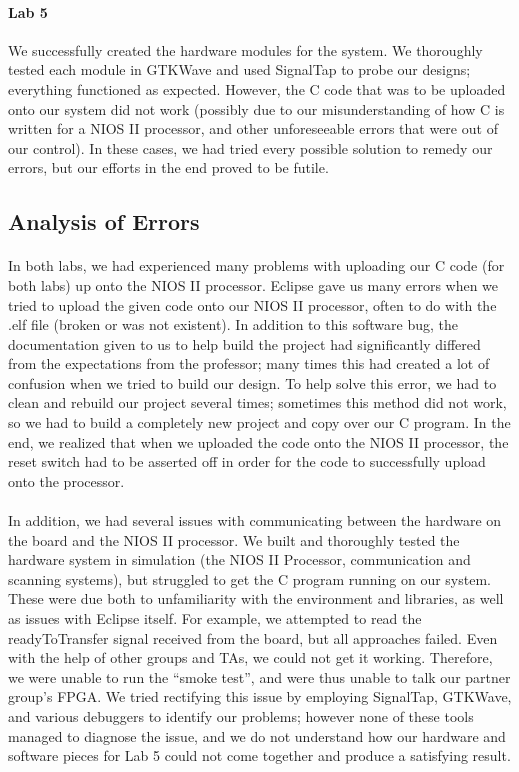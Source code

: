 \documentclass{article}
\begin{document}
  \paragraph{Lab 5} We successfully created the hardware modules for the system. We thoroughly tested each module in GTKWave and used SignalTap to probe our designs; everything functioned as expected. However, the C code that was to be uploaded onto our system did not work (possibly due to our misunderstanding of how C is written for a NIOS II processor, and other unforeseeable errors that were out of our control). In these cases, we had tried every possible solution to remedy our errors, but our efforts in the end proved to be futile.
  
  \subsection{Analysis of Errors}
  \paragraph{} In both labs, we had experienced many problems with uploading our C code (for both labs) up onto the NIOS II processor. Eclipse gave us many errors when we tried to upload the given code onto our NIOS II processor, often to do with the .elf file (broken or was not existent). In addition to this software bug, the documentation given to us to help build the project had significantly differed from the expectations from the professor; many times this had created a lot of confusion when we tried to build our design. To help solve this error, we had to clean and rebuild our project several times; sometimes this method did not work, so we had to build a completely new project and copy over our C program. In the end, we realized that when we uploaded the code onto the NIOS II processor, the reset switch had to be asserted off in order for the code to successfully upload onto the processor. 

  \paragraph{} In addition, we had several issues with communicating between the hardware on the board and the NIOS II processor. We built and thoroughly tested the hardware system in simulation (the NIOS II Processor, communication and scanning systems), but struggled to get the C program running on our system. These were due both to unfamiliarity with the environment and libraries, as well as issues with Eclipse itself. For example, we attempted to read the readyToTransfer signal received from the board, but all approaches failed. Even with the help of other groups and TAs, we could not get it working. Therefore, we were unable to run the “smoke test”, and were thus unable to talk our partner group’s FPGA. We tried rectifying this issue by employing SignalTap, GTKWave, and various debuggers to identify our problems; however none of these tools managed to diagnose the issue, and we do not understand how our hardware and software pieces for Lab 5 could not come together and produce a satisfying result.
\end{document}
